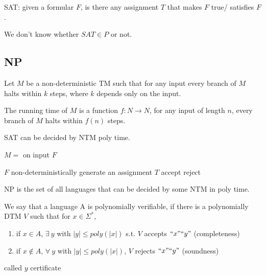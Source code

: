 SAT: given a formular $F$, is there any assignment $T$ that makes $F$ true/ satisfies $F$.

We don't know whether $SAT\in P$ or not.

\subsection{NP}

\begin{definition}
    Let $M$ be a non-deterministic TM such that for any input every branch of $M$ halts within $k$ steps, where $k$ depends only on the input.
    
    The running time of $M$ is a function $f:N\to N$,  for any input of length $n$, every branch of $M$ halts within $f(n)$ steps. 
\end{definition}

SAT can be decided by NTM poly time. 

$M=$ on input $F$
\begin{algorithm}[H]
    \caption{$M$}
    \begin{algorithmic}
        \Require $F$
        \State non-deterministically generate an assignment $T$
            \State accept
        \Else
            \State reject
        \EndIf
    \end{algorithmic}
\end{algorithm}

\begin{definition}
    NP is the set of all languages that can be decided by some NTM in poly time. 
\end{definition}

\begin{definition}
    We say that a language A is polynomially verifiable, if there is a polynomially DTM $V$ such that for $x\in\Sigma^*$,
    \begin{enumerate}
        \item if $x\in A$, $\exists\ y$ with $|y|\le poly(|x|)$ s.t. $V$ accepts ${``x"}{``y"}$ (completeness)
        \item if $x\notin A$, $\forall\ y$ with $|y|\le poly(|x|)$, $V$ rejects ${``x"}{``y"}$ (soundness)
    \end{enumerate}
    called $y$ certificate
\end{definition}

